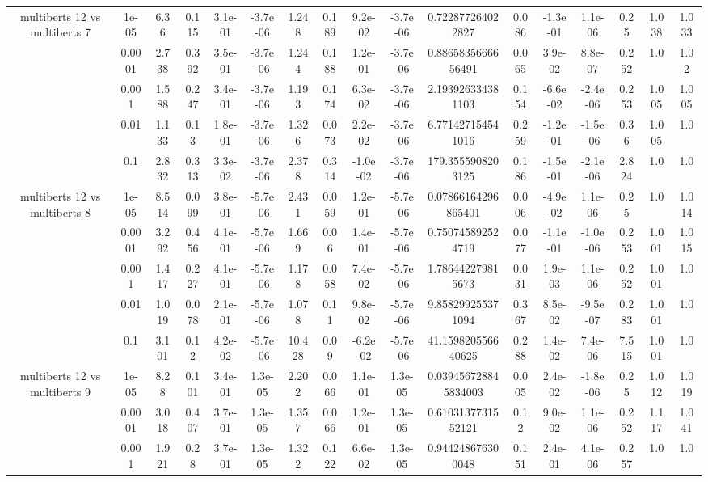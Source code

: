 \begin{tabular}{|c|c|c|c|c|c|c|c|c|c|c|c|c|c|c|c|c|}
\hline
\multirow{5}{*}{multiberts 12 vs multiberts 7} & 1e-05 & 6.36 & 0.115 & 3.1e-01 & -3.7e-06 & 1.248 & 0.189 & 9.2e-02 & -3.7e-06 & 0.722877264022827 & 0.086 & -1.3e-01 & 1.1e-06 & 0.25 & 1.038 & 1.033 \\
 & 0.0001 & 2.738 & 0.392 & 3.5e-01 & -3.7e-06 & 1.244 & 0.188 & 1.2e-01 & -3.7e-06 & 0.8865835666656491 & 0.065 & 3.9e-02 & 8.8e-07 & 0.252 & 1.0 & 1.02 \\
 & 0.001 & 1.588 & 0.247 & 3.4e-01 & -3.7e-06 & 1.193 & 0.174 & 6.3e-02 & -3.7e-06 & 2.193926334381103 & 0.154 & -6.6e-02 & -2.4e-06 & 0.253 & 1.005 & 1.005 \\
 & 0.01 & 1.133 & 0.13 & 1.8e-01 & -3.7e-06 & 1.326 & 0.073 & 2.2e-02 & -3.7e-06 & 6.771427154541016 & 0.259 & -1.2e-01 & -1.5e-06 & 0.36 & 1.005 & 1.0 \\
 & 0.1 & 2.832 & 0.313 & 3.3e-02 & -3.7e-06 & 2.378 & 0.314 & -1.0e-02 & -3.7e-06 & 179.3555908203125 & 0.186 & -1.5e-01 & -2.1e-06 & 2.824 & 1.0 & 1.0 \\
\hline
\multirow{5}{*}{multiberts 12 vs multiberts 8} & 1e-05 & 8.514 & 0.099 & 3.8e-01 & -5.7e-06 & 2.431 & 0.059 & 1.2e-01 & -5.7e-06 & 0.07866164296865401 & 0.006 & -4.9e-02 & 1.1e-06 & 0.25 & 1.0 & 1.014 \\
 & 0.0001 & 3.292 & 0.456 & 4.1e-01 & -5.7e-06 & 1.669 & 0.06 & 1.4e-01 & -5.7e-06 & 0.750745892524719 & 0.077 & -1.1e-01 & -1.0e-06 & 0.253 & 1.001 & 1.015 \\
 & 0.001 & 1.417 & 0.227 & 4.1e-01 & -5.7e-06 & 1.178 & 0.058 & 7.4e-02 & -5.7e-06 & 1.786442279815673 & 0.031 & 1.9e-03 & 1.1e-06 & 0.252 & 1.001 & 1.0 \\
 & 0.01 & 1.019 & 0.078 & 2.1e-01 & -5.7e-06 & 1.078 & 0.11 & 9.8e-02 & -5.7e-06 & 9.858299255371094 & 0.367 & 8.5e-02 & -9.5e-07 & 0.283 & 1.001 & 1.0 \\
 & 0.1 & 3.101 & 0.12 & 4.2e-02 & -5.7e-06 & 10.428 & 0.09 & -6.2e-02 & -5.7e-06 & 41.159820556640625 & 0.288 & 1.4e-02 & 7.4e-06 & 7.515 & 1.001 & 1.0 \\
\hline
\multirow{5}{*}{multiberts 12 vs multiberts 9} & 1e-05 & 8.28 & 0.101 & 3.4e-01 & 1.3e-05 & 2.202 & 0.066 & 1.1e-01 & 1.3e-05 & 0.039456728845834003 & 0.005 & 2.4e-02 & -1.8e-06 & 0.25 & 1.012 & 1.019 \\
 & 0.0001 & 3.018 & 0.407 & 3.7e-01 & 1.3e-05 & 1.357 & 0.066 & 1.2e-01 & 1.3e-05 & 0.6103137731552121 & 0.12 & 9.0e-02 & 1.1e-06 & 0.252 & 1.117 & 1.041 \\
 & 0.001 & 1.921 & 0.28 & 3.7e-01 & 1.3e-05 & 1.322 & 0.122 & 6.6e-02 & 1.3e-05 & 0.944248676300048 & 0.151 & 2.4e-01 & 4.1e-06 & 0.257 & 1.0 & 1.0 \\

\end{tabular}
